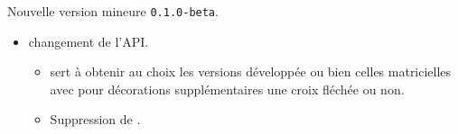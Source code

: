 Nouvelle version mineure \verb+0.1.0-beta+.

\begin{itemize}[itemsep=.5em]
    \item {} changement de l'API.
    \begin{itemize}[itemsep=.5em]
        \item {} sert à obtenir au choix les versions développée ou bien celles matricielles avec pour décorations supplémentaires une croix fléchée ou non.

        \item Suppression de .
    \end{itemize}


\end{itemize}

\separation

